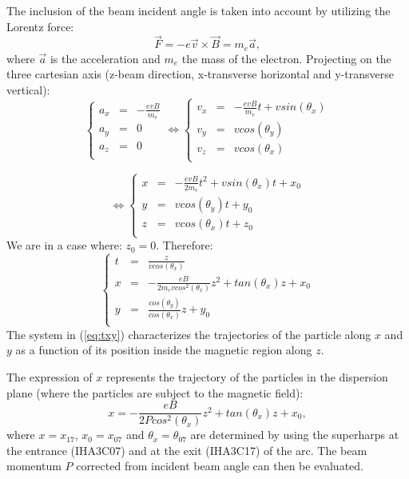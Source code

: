 {The inclusion of the beam incident angle is taken into account by utilizing the Lorentz force:
\begin{equation}
\vec{F}=-e\vec{v}\times \vec{B} = m_e\vec{a},
\end{equation}
where $\vec{a}$ is the acceleration and $m_e$ the mass of the electron. Projecting on the three cartesian
axis (z-beam direction, x-transverse horizontal and y-transverse vertical):
\begin{equation}
\left \{
\begin{array}{lll}
a_x & = & -\frac{evB}{m_e} 	\\
a_y & = & 0			\\
a_z & = & 0			\\
\end{array}
\right .
\Leftrightarrow
\left \{
\begin{array}{lll}
v_x & = &  -\frac{evB}{m_e}t + vsin(\theta _x)	\\
v_y & = & vcos(\theta _y)				\\
v_z & = & vcos(\theta _x)				\\
\end{array}
\right .
\end{equation}

\begin{equation}
\Leftrightarrow
\left \{
\begin{array}{lll}\label{eq:txy}
x & = &  -\frac{evB}{2m_e}t^2 + vsin(\theta _x)t + x_0	\\
y & = & vcos(\theta _y)t + y_0				\\
z & = & vcos(\theta _x)t + z_0				\\
\end{array}
\right .
\end{equation}
We are in a case where: $z_0 = 0$. Therefore:
\begin{equation}
\left \{
\begin{array}{lll}
t & = & \frac{z}{vcos(\theta_x)}					\\
x & = & -\frac{eB}{2m_evcos^2(\theta _x)}z^2 + tan(\theta _x)z + x_0	\\
y & = & \frac{cos(\theta _y)}{cos(\theta _x)}z + y_0			\\
\end{array}
\right .
\end{equation}
The system in (\ref{eq:txy}) characterizes the trajectories of the particle along
$x$ and $y$ as a function of its position inside the magnetic region along $z$.

The expression of $x$ represents the trajectory of the particles in the dispersion plane
(where the particles are subject to the magnetic field):
\begin{equation}
x = -\frac{eB}{2Pcos^2(\theta _x)}z^2 + tan(\theta _x)z + x_0,
\end{equation}
where $x = x_{17}$, $x_0 = x_{07}$ and $\theta _x = \theta _{07}$ are determined by using the superharps
at the entrance (IHA3C07) and at the exit (IHA3C17) of the arc. The beam momentum $P$ corrected from
incident beam angle can then be evaluated.

}
